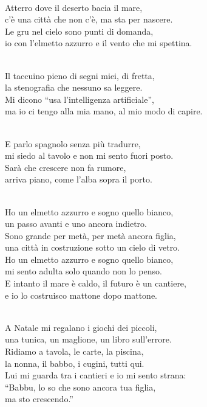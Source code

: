 \begin{lyrics}
\\
Atterro dove il deserto bacia il mare,\\
c’è una città che non c’è, ma sta per nascere.\\
Le gru nel cielo sono punti di domanda,\\
io con l’elmetto azzurro e il vento che mi spettina.

\\
Il taccuino pieno di segni miei, di fretta,\\
la stenografia che nessuno sa leggere.\\
Mi dicono “usa l’intelligenza artificiale”,\\
ma io ci tengo alla mia mano, al mio modo di capire.

\\
E parlo spagnolo senza più tradurre,\\
mi siedo al tavolo e non mi sento fuori posto.\\
Sarà che crescere non fa rumore,\\
arriva piano, come l’alba sopra il porto.

\\
Ho un elmetto azzurro e sogno quello bianco,\\
un passo avanti e uno ancora indietro.\\
Sono grande per metà, per metà ancora figlia,\\
una città in costruzione sotto un cielo di vetro.\\
Ho un elmetto azzurro e sogno quello bianco,\\
mi sento adulta solo quando non lo penso.\\
E intanto il mare è caldo, il futuro è un cantiere,\\
e io lo costruisco mattone dopo mattone.

\\
A Natale mi regalano i giochi dei piccoli,\\
una tunica, un maglione, un libro sull’errore.\\
Ridiamo a tavola, le carte, la piscina,\\
la nonna, il babbo, i cugini, tutti qui.\\
Lui mi guarda tra i cantieri e io mi sento strana:\\
“Babbu, lo so che sono ancora tua figlia,\\
ma sto crescendo.”


\end{lyrics}

